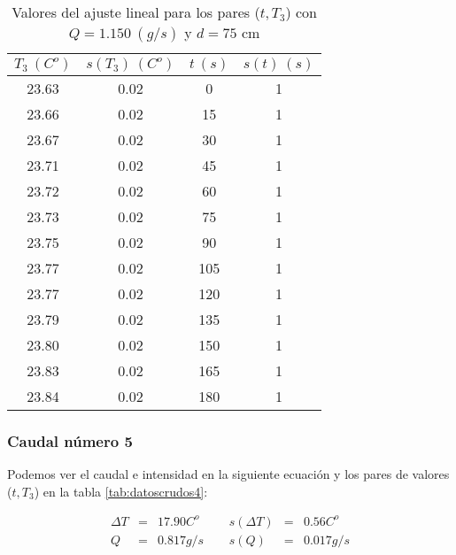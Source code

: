 \documentclass[12pt,a4paper]{article}
\begin{document}
 \begin{table}[h!] 	 \centering 
\begin{tabular}{|c|c|c|c|} 
\hline 
$T_3 \ (C^o)$ & $s(T_3) \ (C^o)$ & $ t \ (s)$ & $s(t) \ (s)$  \\ \hline 
23.63  & 0.02 &  0 & 1 \\ 
\hline
23.66  & 0.02 &  15 & 1 \\ 
\hline
23.67  & 0.02 &  30 & 1 \\ 
\hline
23.71  & 0.02 &  45 & 1 \\ 
\hline
23.72  & 0.02 &  60 & 1 \\ 
\hline
23.73  & 0.02 &  75 & 1 \\ 
\hline
23.75  & 0.02 &  90 & 1 \\ 
\hline
23.77  & 0.02 &  105 & 1 \\ 
\hline
23.77  & 0.02 &  120 & 1 \\ 
\hline
23.79  & 0.02 &  135 & 1 \\ 
\hline
23.80  & 0.02 &  150 & 1 \\ 
\hline
23.83  & 0.02 &  165 & 1 \\ 
\hline
23.84  & 0.02 &  180 & 1 \\ 
\hline
\end{tabular} 
\caption{Valores del ajuste lineal para los pares ($t,T_3$) con $Q=1.150 \ (g/s)$ y $d= 75 $ cm} 
\label{tab:datoscrudos3} 
\end{table} 
 
\newpage
 
\subsubsection{Caudal número 5} \label{subsec:5} 
 
Podemos ver el caudal e intensidad en la siguiente ecuación y los pares de valores ($t,T_3$) en la tabla \ref{tab:datoscrudos4}: 
 
\begin{equation} 
\begin{array}{lllllll}
\Delta T & = & 17.90 C^o &  \ \ &  s(\Delta T) & =  & 0.56  C^o \\ 
 Q & = & 0.817 g/s &  \ \ &  s(Q) & =  & 0.017  g/s \\ 
 \end{array} 
\end{equation} 
 
\end{document}
